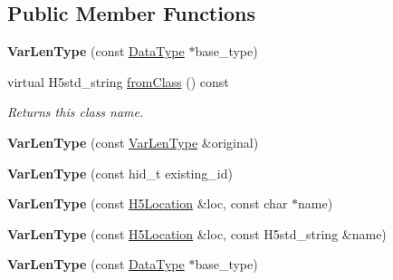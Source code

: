 \subsection*{Public Member Functions}
\begin{DoxyCompactItemize}
\item 
\mbox{\label{class_h5_1_1_var_len_type_ac1430fe928bbc31e020b704042b9937c}} 
{\bfseries Var\+Len\+Type} (const \hyperlink{class_h5_1_1_data_type}{Data\+Type} $\ast$base\+\_\+type)
\item 
\mbox{\label{class_h5_1_1_var_len_type_a781d7c99f66c97e3b09039151ce9158c}} 
virtual H5std\+\_\+string \hyperlink{class_h5_1_1_var_len_type_a781d7c99f66c97e3b09039151ce9158c}{from\+Class} () const
\begin{DoxyCompactList}\small\item\em Returns this class name. \end{DoxyCompactList}\item 
\mbox{\label{class_h5_1_1_var_len_type_adeb826c9c1d66db024f7b7490cf2800c}} 
{\bfseries Var\+Len\+Type} (const \hyperlink{class_h5_1_1_var_len_type}{Var\+Len\+Type} \&original)
\item 
\mbox{\label{class_h5_1_1_var_len_type_a39d795077e0be23b952bfc40987861fa}} 
{\bfseries Var\+Len\+Type} (const hid\+\_\+t existing\+\_\+id)
\item 
\mbox{\label{class_h5_1_1_var_len_type_aa6a06d518116dca0c4ba4800e98125b6}} 
{\bfseries Var\+Len\+Type} (const \hyperlink{class_h5_1_1_h5_location}{H5\+Location} \&loc, const char $\ast$name)
\item 
\mbox{\label{class_h5_1_1_var_len_type_aeb26aa2407f4a9ad0f7a6bb4baff1f08}} 
{\bfseries Var\+Len\+Type} (const \hyperlink{class_h5_1_1_h5_location}{H5\+Location} \&loc, const H5std\+\_\+string \&name)
\item 
\mbox{\label{class_h5_1_1_var_len_type_ac1430fe928bbc31e020b704042b9937c}} 
{\bfseries Var\+Len\+Type} (const \hyperlink{class_h5_1_1_data_type}{Data\+Type} $\ast$base\+\_\+type)
\item 

\end{DoxyCompactItemize}

